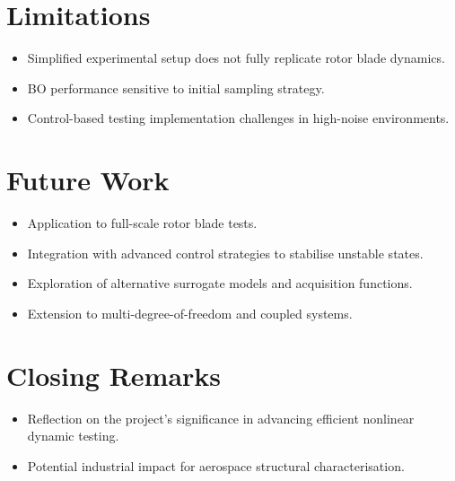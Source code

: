 \section{Limitations}
\begin{itemize}
    \item Simplified experimental setup does not fully replicate rotor blade dynamics.
    \item BO performance sensitive to initial sampling strategy.
    \item Control-based testing implementation challenges in high-noise environments.
\end{itemize}

\section{Future Work}
\begin{itemize}
    \item Application to full-scale rotor blade tests.
    \item Integration with advanced control strategies to stabilise unstable states.
    \item Exploration of alternative surrogate models and acquisition functions.
    \item Extension to multi-degree-of-freedom and coupled systems.
\end{itemize}

\section{Closing Remarks}
\begin{itemize}
    \item Reflection on the project’s significance in advancing efficient nonlinear dynamic testing.
    \item Potential industrial impact for aerospace structural characterisation.
\end{itemize}
